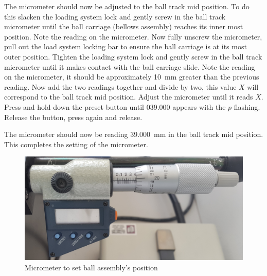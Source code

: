 \begin{appendices}
    The micrometer should now be adjusted to the ball track mid position.
    To do this slacken the loading system lock and gently screw in the ball track micrometer until the ball carriage (bellows assembly) reaches its inner most position.
    Note the reading on the micrometer.
    Now fully unscrew the micrometer, pull out the load system locking bar to ensure the ball carriage is at its most outer position.
    Tighten the loading system lock and gently screw in the ball track micrometer until it makes contact with the ball carriage slide.
    Note the reading on the micrometer, it should be approximately \SI{10}{\mm} greater than the previous reading.
    Now add the two readings together and divide by two, this value $X$ will correspond to the ball track mid position.
    Adjust the micrometer until it reads $X$.
    Press and hold down the preset button until \num{039.000} appears with the $p$ flashing.
    Release the button, press again and release.

    The micrometer should now be reading \SI{39.000}{\mm} in the ball track mid position.
    This completes the setting of the micrometer.
    \begin{figure}[htb]
        \centering
        \includegraphics[width=0.8\linewidth]{./images/micrometer.jpg}
        \caption{Micrometer to set ball assembly's position}
        \label{fig:micrometer_ball_assembly_position}
    \end{figure}



\end{appendices}
